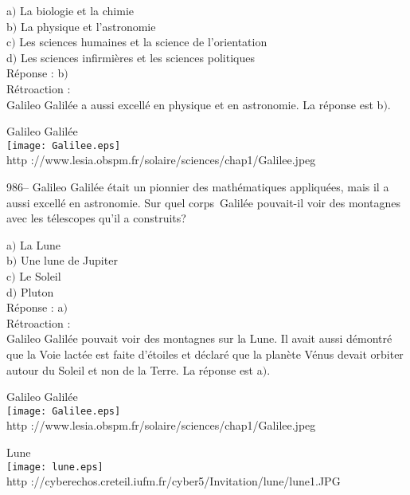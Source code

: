 ﻿\documentclass[letterpaper, 12pt]{article}
\begin{document}
a$)$ La biologie et la chimie \\
b$)$ La physique et l'astronomie \\
c$)$ Les sciences humaines et la science de l'orientation \\
d$)$ Les sciences infirmi\`eres et les sciences politiques\\

R\'eponse : b$)$\\

R\'etroaction : \\
Galileo Galil\'ee a aussi excell\'e en physique et en astronomie. La
r\'eponse est b$)$.

        \begin{center}
        Galileo Galil\'ee\\
    \texttt{[image: Galilee.eps]}\\
        {\footnotesize http
://www.lesia.obspm.fr/solaire/sciences/chap1/Galilee.jpeg}
    \end{center}

986-- Galileo Galil\'ee \'etait un pionnier des math\'ematiques
appliqu\'ees, mais il a aussi excell\'e en astronomie. Sur quel \og
corps\fg\ Galil\'ee pouvait-il voir des montagnes avec les
t\'elescopes qu'il a construits?

a$)$ La Lune \\
b$)$ Une lune de Jupiter \\
c$)$ Le Soleil \\
d$)$ Pluton\\

R\'eponse : a$)$\\

R\'etroaction : \\
Galileo Galil\'ee pouvait voir des montagnes sur la Lune. Il avait
aussi d\'emontr\'e que la Voie lact\'ee est faite d'\'etoiles et
d\'eclar\'e que la plan\`ete V\'enus devait orbiter autour du Soleil
et non de la Terre.
La r\'eponse est a$)$.\\

        \begin{center}
        Galileo Galil\'ee\\
    \texttt{[image: Galilee.eps]}\\
        {\footnotesize http
://www.lesia.obspm.fr/solaire/sciences/chap1/Galilee.jpeg}
    \end{center}

        \begin{center}
        Lune\\
    \texttt{[image: lune.eps]}\\
        {\footnotesize http
://cyberechos.creteil.iufm.fr/cyber5/Invitation/lune/lune1.JPG}
    \end{center}
\end{document}
